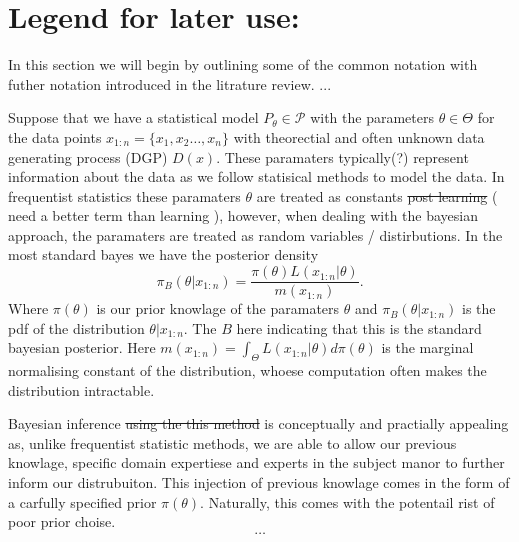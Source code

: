 \documentclass[11pt,a4paper]{article}
\begin{document}
\section{Legend for later use:}

In this section we will begin by outlining some of the common notation with futher notation introduced in the litrature review.
...

Suppose that we have a statistical model $P_\theta \in \mathcal{P}$ with the parameters $\theta \in \Theta$ for the data points $x_{1:n} = \{x_1, x_2 \dots, x_n\}$ with theorectial and often unknown data generating process (DGP) $D(x)$. These paramaters typically(?) represent information about the data as we follow statisical methods to model the data. In frequentist statistics these paramaters $\theta$ are treated as constants \sout{post learning} ( need a better term than learning ), however, when dealing with the bayesian approach, the paramaters are treated as random variables / distirbutions. In the most standard bayes we have the  posterior density $$\pi_B(\theta | x_{1:n}) = \frac{\pi(\theta) L(x_{1:n}|\theta)}{m(x_{1:n})}\text{.}$$
Where $\pi(\theta)$ is our prior knowlage of the paramaters $\theta$ and $\pi_B(\theta | x_{1:n})$ is the pdf of the distribution $\theta | x_{1:n}$. The $B$ here indicating that this is the standard bayesian posterior. Here $m(x_{1:n}) = \int_{\Theta} L(x_{1:n} | \theta) d\pi(\theta)$ is the marginal normalising constant of the distribution, whoese computation often makes the distribution intractable.

Bayesian inference \sout{using the this method} is conceptually and practially appealing as, unlike frequentist statistic methods, we are able to allow our previous knowlage, specific domain expertiese and experts in the subject manor to further inform our distrubuiton. This injection of previous knowlage comes in the form of a carfully specified prior $\pi(\theta)$. Naturally, this comes with the potentail rist of poor prior choise. $$\dots$$
\end{document}

